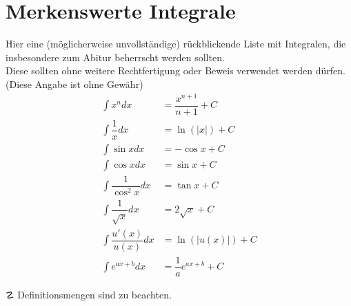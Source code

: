 \documentclass[main.tex]{subfiles}
\begin{document}
\section{Merkenswerte Integrale}
Hier eine (möglicherweise unvollständige) rückblickende Liste mit Integralen, die insbesondere zum Abitur beherrscht werden sollten.\\
Diese sollten ohne weitere Rechtfertigung oder Beweis verwendet werden dürfen. (Diese Angabe ist ohne Gewähr)\\
\begin{align*}
  \int x^n dx &=\dfrac{x^{n+1}}{n+1} + C\\
  \int\dfrac{1}{x} dx &= \ln(|x|) + C\\
  \int\sin x dx &= -\cos x + C\\
  \int\cos x dx &= \sin x + C\\
  \int\dfrac{1}{\cos^2x}dx &= \tan x + C\\
  \int\dfrac{1}{\sqrt{x}}dx &= 2\sqrt{x} + C\\
  \int\dfrac{u'(x)}{u(x)} dx &= \ln(|u(x)|) + C\\
  \int e^{ax+b}dx &= \dfrac{1}{a}e^{ax+b} + C
\end{align*}

$\danger$ Definitionsmengen sind zu beachten.
\end{document}
